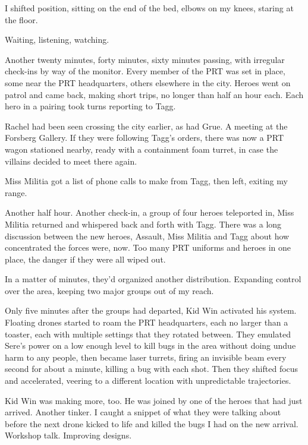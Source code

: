 I shifted position, sitting on the end of the bed, elbows on my knees, staring at the floor.



Waiting, listening, watching.



Another twenty minutes, forty minutes, sixty minutes passing, with irregular check-ins by way of the monitor.  Every member of the PRT was set in place, some near the PRT headquarters, others elsewhere in the city.  Heroes went on patrol and came back, making short trips, no longer than half an hour each.  Each hero in a pairing took turns reporting to Tagg.



Rachel had been seen crossing the city earlier, as had Grue.  A meeting at the Forsberg Gallery.  If they were following Tagg's orders, there was now a PRT wagon stationed nearby, ready with a containment foam turret, in case the villains decided to meet there again.



Miss Militia got a list of phone calls to make from Tagg, then left, exiting my range.



Another half hour.  Another check-in, a group of four heroes teleported in, Miss Militia returned and whispered back and forth with Tagg.  There was a long discussion between the new heroes, Assault, Miss Militia and Tagg about how concentrated the forces were, now.  Too many PRT uniforms and heroes in one place, the danger if they were all wiped out.



In a matter of minutes, they'd organized another distribution.  Expanding control over the area, keeping two major groups out of my reach.



Only five minutes after the groups had departed, Kid Win activated his system.  Floating drones started to roam the PRT headquarters, each no larger than a toaster, each with multiple settings that they rotated between.  They emulated Sere's power on a low enough level to kill bugs in the area without doing undue harm to any people, then became laser turrets, firing an invisible beam every second for about a minute, killing a bug with each shot.  Then they shifted focus and accelerated, veering to a different location with unpredictable trajectories.



Kid Win was making more, too.  He was joined by one of the heroes that had just arrived.  Another tinker.  I caught a snippet of what they were talking about before the next drone kicked to life and killed the bugs I had on the new arrival.  Workshop talk.  Improving designs.



